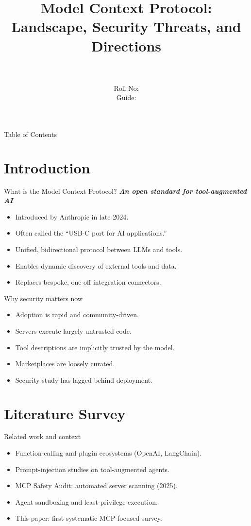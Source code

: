 \documentclass{beamer}
\title[\seminarShortTitle]{Model Context Protocol: Landscape, Security Threats, and Directions}
\author[\seminarName\ (\seminarShortCollege)]{\seminarName \\ \seminarRoll \\ Roll No: \seminarClassRoll \\ Guide: \seminarGuide}
\institute[\seminarShortCollege]{\seminarDept \\ \seminarCollege}
\date{\seminarDate}
\begin{document}
\begin{frame}\titlepage\end{frame}
\begin{frame}{Table of Contents}\tableofcontents\end{frame}
\section{Introduction}
\begin{frame}{What is the Model Context Protocol?}
\textbf{\textit{An open standard for tool-augmented AI}}
\begin{itemize}
  \item Introduced by Anthropic in late 2024.
  \item Often called the ``USB-C port for AI applications.''
  \item Unified, bidirectional protocol between LLMs and tools.
  \item Enables dynamic discovery of external tools and data.
  \item Replaces bespoke, one-off integration connectors.
\end{itemize}
\end{frame}

\begin{frame}{Why security matters now}
\begin{itemize}
  \item Adoption is rapid and community-driven.
  \item Servers execute largely untrusted code.
  \item Tool descriptions are implicitly trusted by the model.
  \item Marketplaces are loosely curated.
  \item Security study has lagged behind deployment.
\end{itemize}
\end{frame}

\section{Literature Survey}
\begin{frame}{Related work and context}
\begin{itemize}
  \item Function-calling and plugin ecosystems (OpenAI, LangChain).
  \item Prompt-injection studies on tool-augmented agents.
  \item MCP Safety Audit: automated server scanning (2025).
  \item Agent sandboxing and least-privilege execution.
  \item This paper: first systematic MCP-focused survey.
\end{itemize}
\end{frame}
\end{document}
